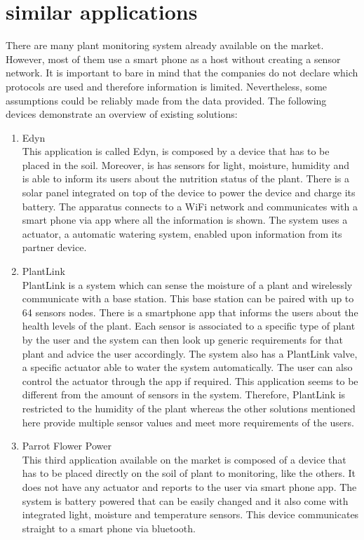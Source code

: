 \section{similar applications}
There are many plant monitoring system already available on the market. However, most of them use a smart phone as a host without creating a sensor network. It is important to bare in mind that the companies do not declare which protocols are used and therefore information is limited. Nevertheless, some assumptions could be reliably made from the data provided. The following devices demonstrate an overview of existing solutions:\\
\begin{enumerate}
	\item Edyn \\
This application is called Edyn, is composed by a device that has to be placed in the soil. Moreover, is has sensors for light, moisture, humidity and is able to inform its users about the nutrition status of the plant. There is a solar panel integrated on top of the device to power the device and charge its battery. The apparatus connects to a WiFi network and communicates with a smart phone via app where all the information is shown. The system uses a actuator, a automatic watering system, enabled upon information from its partner device.\\
\item PlantLink\\
PlantLink is a system which can sense the moisture of a plant and wirelessly communicate with a base station. This base station can be paired with up to 64 sensors nodes. There is a smartphone app that informs the users about the health levels of the plant. Each sensor is associated to a specific type of plant by the user and the system can then look up generic requirements for that plant and advice the user accordingly. The system also has a PlantLink valve, a specific actuator able to water the system automatically. The user can also control the actuator through the app if required. This application seems to be different from the amount of sensors in the system. Therefore, PlantLink is restricted to the humidity of the plant whereas the other solutions mentioned here provide multiple sensor values and meet more requirements of the users.\\

\item Parrot Flower Power\\
This third application available on the market is composed of a device that has to be placed directly on the soil of plant to monitoring, like the others. It does not have any actuator and reports to the user via smart phone app. The system is battery powered that can be easily changed and it also come with integrated light, moisture and temperature sensors. This device communicates straight to a smart phone via bluetooth.
\end{enumerate}

